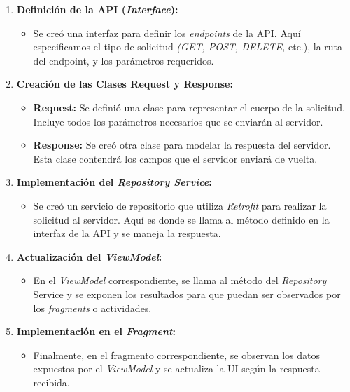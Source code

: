 \begin{enumerate}
    \item \textbf{Definición de la API (\textit{Interface}):}
    
    \begin{itemize}
        \item Se creó una interfaz para definir los \textit{endpoints} de la API. Aquí especificamos el tipo de solicitud \textit{(GET, POST, DELETE,} etc.), la ruta del endpoint, y los parámetros requeridos.
    \end{itemize}

    \item \textbf{Creación de las Clases Request y Response:}
    \begin{itemize}
        \item \textbf{Request:} Se definió una clase para representar el cuerpo de la solicitud. Incluye todos los parámetros necesarios que se enviarán al servidor.
        \item \textbf{Response:} Se creó otra clase para modelar la respuesta del servidor. Esta clase contendrá los campos que el servidor enviará de vuelta.

    \end{itemize}

    \item \textbf{Implementación del \textit{Repository Service}:}
    \begin{itemize}
        \item Se creó un servicio de repositorio que utiliza \textit{Retrofit} para realizar la solicitud al servidor. Aquí es donde se llama al método definido en la interfaz de la API y se maneja la respuesta.

    \end{itemize}

    \item \textbf{Actualización del \textit{ViewModel}:}
    \begin{itemize}
        \item En el \textit{ViewModel} correspondiente, se llama al método del \textit{Repository} Service y se exponen los resultados para que puedan ser observados por los \textit{fragments} o actividades.

    \end{itemize}

    \item \textbf{Implementación en el \textit{Fragment}:}
    \begin{itemize}
        \item Finalmente, en el fragmento correspondiente, se observan los datos expuestos por el \textit{ViewModel} y se actualiza la UI según la respuesta recibida.

    \end{itemize}
\end{enumerate}



